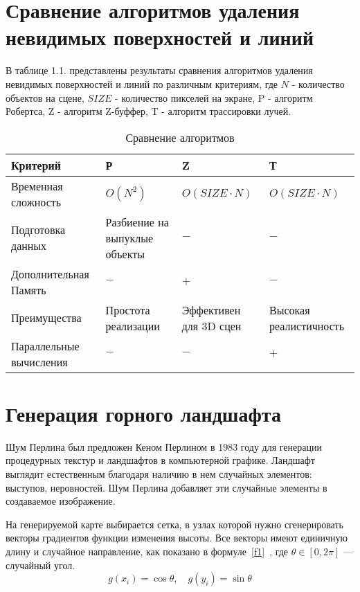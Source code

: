 \section{Сравнение алгоритмов удаления невидимых поверхностей и линий}
В таблице 1.1. представлены результаты сравнения алгоритмов удаления невидимых поверхностей и линий по различным критериям, где 
$N$ - количество объектов на сцене, $SIZE$ - количество пикселей на экране, P - алгоритм Робертса, Z - алгоритм Z-буффер, T - алгоритм трассировки лучей. 

\begin{table}[h!]
        \small
        \captionsetup{justification=raggedright, singlelinecheck=false, labelsep=endash}
		\caption{Сравнение алгоритмов}
		
		\label{tbl:comparing_algorithms}
		\begin{tabular}{|p{3cm}|p{3cm}|p{3cm}|p{5cm}|}
			 \hline 
             Критерий & Р & Z & Т \\ 
             \hline 
             Временная сложность & $O(N^2)$ & $O(SIZE \cdot N)$ & $O(SIZE \cdot N)$ \\
             \hline
             Подготовка данных & Разбиение на выпуклые объекты & $-$ & $-$ \\
             \hline
             Дополнительная Память & $-$ & $+$ & $-$ \\
             \hline
             Преимущества & Простота реализации & Эффективен для 3D сцен & Высокая реалистичность \\
             \hline
             Параллельные вычисления & $-$ & $-$ & $+$ \\ 
             \hline
		\end{tabular}
\end{table}

\section{Генерация горного ландшафта}
Шум Перлина был предложен Кеном Перлином в 1983 году для генерации процедурных текстур и ландшафтов в компьютерной графике. Ландшафт выглядит естественным благодаря наличию в нем случайных элементов: выступов, неровностей. Шум Перлина добавляет эти случайные элементы в создаваемое изображение.

На генерируемой карте выбирается сетка, в узлах которой нужно сгенерировать векторы градиентов функции изменения высоты. Все векторы имеют единичную длину и случайное направление, как показано в формуле~\ref{f1}~\cite{real_time}, где $\theta \in [0, 2\pi]$ --- случайный угол.
\begin{equation}
g(x_i) = \cos{\theta} , \quad
g(y_i) = \sin{\theta}
\label{f1}
\end{equation}

